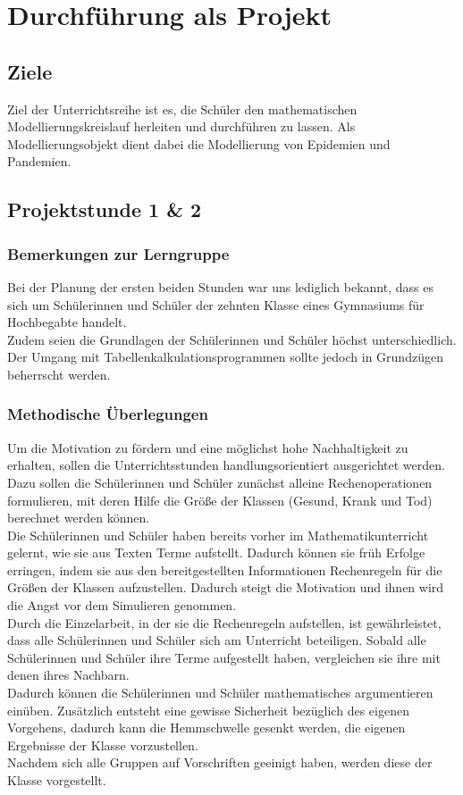 \section{Durchführung als Projekt}
\subsection{Ziele}
\steffen
Ziel der Unterrichtsreihe ist es, die Schüler den mathematischen Modellierungskreislauf herleiten und durchführen zu lassen. Als Modellierungsobjekt dient dabei die Modellierung von Epidemien und Pandemien. 



\subsection{Projektstunde 1 \& 2}\ellen
\subsubsection*{Bemerkungen zur Lerngruppe}\label{ssec:project:34:lerngruppe}
Bei der Planung der ersten beiden Stunden war uns lediglich bekannt, dass es sich um Schülerinnen und Schüler der zehnten Klasse eines Gymnasiums für Hochbegabte handelt.\\
Zudem seien die Grundlagen der Schülerinnen und Schüler höchst unterschiedlich. Der Umgang mit Tabellenkalkulationsprogrammen sollte jedoch in Grundzügen beherrscht werden. 
\subsubsection*{Methodische Überlegungen}
Um die Motivation zu fördern und eine möglichst hohe Nachhaltigkeit zu erhalten, sollen die Unterrichtsstunden handlungsorientiert ausgerichtet werden. Dazu sollen die Schülerinnen und Schüler zunächst alleine Rechenoperationen formulieren, mit deren Hilfe die Größe der Klassen (Gesund, Krank und Tod) berechnet werden können.\\
Die Schülerinnen und Schüler haben bereits vorher im Mathematikunterricht gelernt, wie sie aus Texten Terme aufstellt. Dadurch können sie früh Erfolge erringen, indem sie aus den bereitgestellten Informationen Rechenregeln für die Größen der Klassen aufzustellen. Dadurch steigt die Motivation und ihnen wird die Angst vor dem Simulieren genommen.\\
Durch die Einzelarbeit, in der sie die Rechenregeln aufstellen, ist gewährleistet, dass alle Schülerinnen und Schüler sich am Unterricht beteiligen. Sobald alle Schülerinnen und Schüler ihre Terme aufgestellt haben, vergleichen sie ihre mit denen ihres Nachbarn.\\
Dadurch können die Schülerinnen und Schüler mathematisches argumentieren einüben. Zusätzlich entsteht eine gewisse Sicherheit bezüglich des eigenen Vorgehens, dadurch kann die Hemmschwelle gesenkt werden, die eigenen Ergebnisse der Klasse vorzustellen.\\
Nachdem sich alle Gruppen auf Vorschriften geeinigt haben, werden diese der Klasse vorgestellt.

